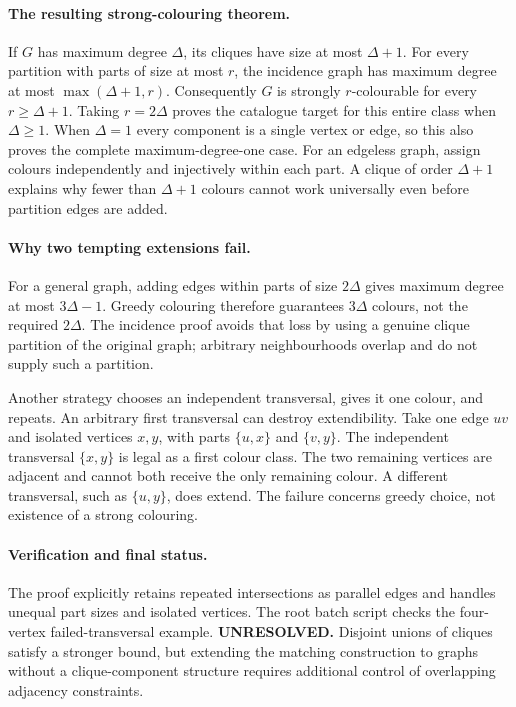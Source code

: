\documentclass[11pt,a4paper]{article}
\begin{document}
\paragraph{The resulting strong-colouring theorem.}
If $G$ has maximum degree $\Delta$, its cliques have size at most
$\Delta+1$. For every partition with parts of size at most $r$, the
incidence graph has maximum degree at most
$\max(\Delta+1,r)$. Consequently $G$ is strongly $r$-colourable for every
$r\ge\Delta+1$. Taking $r=2\Delta$ proves the catalogue target for this
entire class when $\Delta\ge1$. When $\Delta=1$ every component is a
single vertex or edge, so this also proves the complete maximum-degree-one
case. For an edgeless graph, assign colours independently and injectively
within each part. A clique of order $\Delta+1$ explains why fewer than
$\Delta+1$ colours cannot work universally even before partition edges
are added.

\paragraph{Why two tempting extensions fail.}
For a general graph, adding edges within parts of size $2\Delta$ gives
maximum degree at most $3\Delta-1$. Greedy colouring therefore guarantees
$3\Delta$ colours, not the required $2\Delta$. The incidence proof avoids
that loss by using a genuine clique partition of the original graph;
arbitrary neighbourhoods overlap and do not supply such a partition.

Another strategy chooses an independent transversal, gives it one colour,
and repeats. An arbitrary first transversal can destroy extendibility.
Take one edge $uv$ and isolated vertices $x,y$, with parts $\{u,x\}$ and
$\{v,y\}$. The independent transversal $\{x,y\}$ is legal as a first
colour class. The two remaining vertices are adjacent and cannot both
receive the only remaining colour. A different transversal, such as
$\{u,y\}$, does extend. The failure concerns greedy choice, not existence
of a strong colouring.

\paragraph{Verification and final status.}
The proof explicitly retains repeated intersections as parallel edges and
handles unequal part sizes and isolated vertices. The root batch script
checks the four-vertex failed-transversal example. \textbf{UNRESOLVED.}
Disjoint unions of cliques satisfy a stronger bound, but extending the
matching construction to graphs without a clique-component structure
requires additional control of overlapping adjacency constraints.
\end{document}
